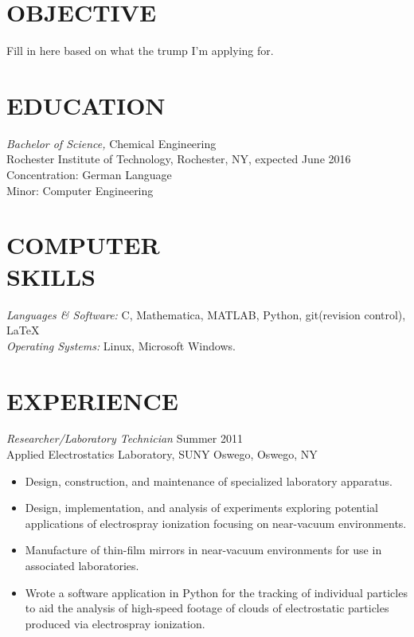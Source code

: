 \documentclass[line,margin]{res}
\begin{document}
\address{3241 Nathaniel Rochester Hall, Rochester, NY 14623}
\address{(315) 391-7268}

\begin{resume}
 
\section{OBJECTIVE}       Fill in here based on what the trump I'm applying for. 
 
 
\section{EDUCATION} {\sl Bachelor of Science,} Chemical Engineering \\
                Rochester Institute of Technology, Rochester, NY, 
                expected June 2016 \\
                Concentration: German Language \\
                Minor: Computer Engineering
 
 
\section{COMPUTER \\ SKILLS} {\sl Languages \& Software:} C, Mathematica,
						MATLAB, Python, git(revision control), \LaTeX\\
                {\sl Operating Systems:} Linux, Microsoft Windows.
 
\section{EXPERIENCE} {\sl Researcher/Laboratory Technician} \hfill Summer 2011 \\
                Applied Electrostatics Laboratory, 
                SUNY Oswego, Oswego, NY
                 \begin{itemize}  \itemsep -2pt %
                \item   Design, construction, and maintenance of 
				        specialized laboratory apparatus.
                \item   Design, implementation, and analysis of
				        experiments exploring potential applications
						of electrospray ionization focusing
						on near-vacuum environments.
				\item   Manufacture of thin-film mirrors in
				        near-vacuum environments for use in
						associated laboratories.
				\item   Wrote a software application in Python
						for the tracking of individual particles
						to aid the analysis of high-speed footage
						of clouds of electrostatic particles
						produced via electrospray ionization.
                \end{itemize}
 

\end{resume}
\end{document}
